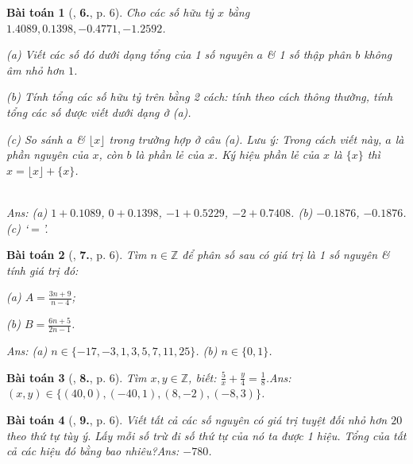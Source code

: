 \documentclass{article}
\numberwithin{equation}{section}
\newtheorem{baitoan}{Bài toán}
\begin{document}
\begin{baitoan}[\cite{Binh_Toan_7_tap_1}, \textbf{6.}, p. 6]
	Cho các số hữu tỷ $x$ bằng $1.4089, 0.1398, -0.4771, -1.2592$.
	\begin{enumerate*}
		\item[(a)] Viết các số đó dưới dạng tổng của 1 số nguyên $a$ \& 1 số thập phân $b$ không âm nhỏ hơn $1$.
		\item[(b)] Tính tổng các số hữu tỷ trên bằng 2 cách: tính theo cách thông thường, tính tổng các số được viết dưới dạng ở (a).
		\item[(c)] So sánh $a$ \& $\lfloor x\rfloor$ trong trường hợp ở câu (a). Lưu ý: Trong cách viết này, $a$ là \emph{phần nguyên} của $x$, còn $b$ là \emph{phần lẻ} của $x$. Ký hiệu phần lẻ của $x$ là $\{x\}$ thì $x = \lfloor x\rfloor + \{x\}$.
	\end{enumerate*}\\\mbox{}\hfill\textsf{Ans:} (a) $1 + 0.1089$, $0 + 0.1398$, $-1 + 0.5229$, $-2 + 0.7408$. (b) $-0.1876$, $-0.1876$. (c) `$=$'.
\end{baitoan}

\begin{baitoan}[\cite{Binh_Toan_7_tap_1}, \textbf{7.}, p. 6]
	Tìm $n\in\mathbb{Z}$ để phân số sau có giá trị là 1 số nguyên \& tính giá trị đó:
	\begin{enumerate*}
		\item[(a)] $A = \frac{3n + 9}{n - 4}$;
		\item[(b)] $B = \frac{6n + 5}{2n - 1}$.
	\end{enumerate*}\hfill\textsf{Ans:} (a) $n\in\{-17,-3,1,3,5,7,11,25\}$. (b) $n\in\{0,1\}$.
\end{baitoan}

\begin{baitoan}[\cite{Binh_Toan_7_tap_1}, \textbf{8.}, p. 6]
	Tìm $x,y\in\mathbb{Z}$, biết: $\frac{5}{x} + \frac{y}{4} = \frac{1}{8}$.\hfill\textsf{Ans:} $(x,y)\in\{(40,0),(-40,1),(8,-2),(-8,3)\}$.
\end{baitoan}

\begin{baitoan}[\cite{Binh_Toan_7_tap_1}, \textbf{9.}, p. 6]
	Viết tất cả các số nguyên có giá trị tuyệt đối nhỏ hơn $20$ theo thứ tự tùy ý. Lấy mỗi số trừ đi số thứ tự của nó ta được 1 hiệu. Tổng của tất cả các hiệu đó bằng bao nhiêu?\hfill\textsf{Ans:} $-780$.
\end{baitoan}
\end{document}
